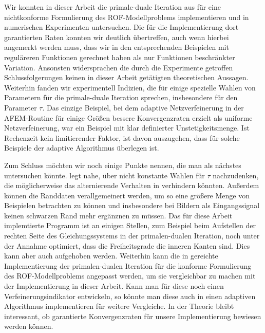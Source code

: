 Wir konnten in dieser Arbeit die primale-duale Iteration aus
\cite{Bar15} für eine nichtkonforme Formulierung des ROF-Modellproblems
implementieren und in numerischen Experimenten untersuchen. 
Die für die Implementierung dort garantierten Raten konnten wir deutlich 
übertreffen, auch wenn hierbei angemerkt werden muss, dass wir in den
entsprechenden Beispielen mit reguläreren Funktionen gerechnet haben
als nur Funktionen beschränkter Variation.
Ansonsten widersprachen die durch die Experimente getroffen Schlussfolgerungen
keinen in dieser Arbeit getätigten theoretischen Aussagen.
Weiterhin fanden wir experimentell Indizien, die für einige spezielle Wahlen
von Parametern für die primale-duale Iteration sprechen, insbesondere
für den Parameter $\tau$.
Das einzige Beispiel, bei dem adaptive Netzverfeinerung in der 
AFEM-Routine für einige Größen bessere Konvergenzraten erzielt als uniforme
Netzverfeinerung, war ein Beispiel mit klar definierter Unstetigkeitsmenge.
Ist Rechenzeit kein limitierender Faktor, ist davon auszugehen, dass für
solche Beispiele der adaptive Algorithmus überlegen ist.

Zum Schluss möchten wir noch einige Punkte nennen, die man als nächstes
untersuchen könnte.
 legt nahe, über nicht konstante Wahlen für
$\tau$ nachzu\-denken, die mög\-lich\-er\-wei\-se das alternierende Verhalten in
 verhindern könnten.
Außerdem können die Randdaten verallgemeinert werden, um so eine größere
Menge von Beispielen betrachten zu können und insbesondere bei Bildern
als Eingangssignal keinen schwarzen Rand mehr ergänznen zu müssen. 
Das für diese Arbeit implemtierte Programm ist an einigen Stellen, zum Beispiel
beim Aufstellen der rechten Seite des Gleichungssystems in der primalen-dualen
Iteration, noch unter der Annahme optimiert, dass die Freiheitsgrade die inneren
Kanten sind.  
Dies kann aber auch aufgehoben werden.
Weiterhin kann die in \cite{Bar15} gereichte Implementierung der primalen-dualen
Iteration für die konforme Formulierung des ROF-Modellproblems angepasst werden,
um sie vergleichbar zu machen mit der Implementierung in dieser Arbeit. 
Kann man für diese noch einen Verfeinerungsindikator entwickeln, so könnte man
diese auch in einen adaptiven Algorithmus implementieren für weitere Vergleiche.
In der Theorie bleibt interessant, ob garantierte Konvergenzraten für unsere
Implementierung bewiesen werden können.

